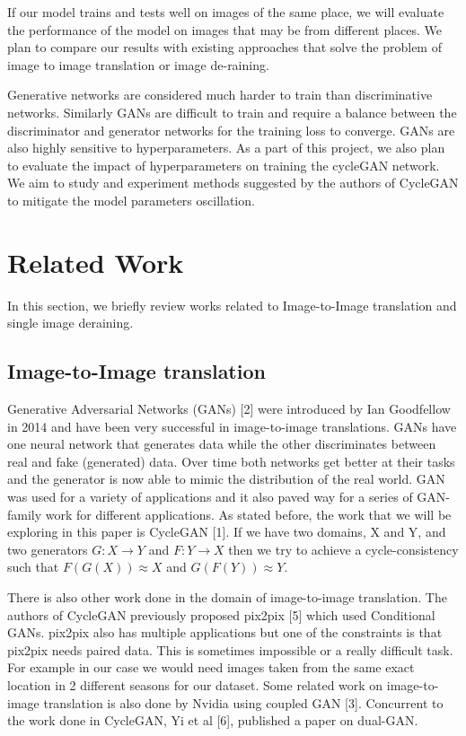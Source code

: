 \documentclass{article}
\begin{document}
If our model trains and tests well on images of the same place, we will 
evaluate the performance of the model on images that may be from different 
places. We plan to compare our results with existing approaches that solve 
the problem of image to image translation or image de-raining.

Generative networks are considered much harder to train than discriminative 
networks. Similarly GANs are difficult to train and require a balance 
between the discriminator and generator networks for the training loss 
to converge. GANs are also highly sensitive to hyperparameters. 
As a part of this project, we also plan to evaluate the impact of 
hyperparameters on training the cycleGAN network. We aim to study and 
experiment methods suggested by the authors of CycleGAN to mitigate the 
model parameters oscillation.

\section{Related Work}
\label{gen_inst}

In this section, we briefly review works related to Image-to-Image translation and single image deraining.

\subsection{Image-to-Image translation}

Generative Adversarial Networks (GANs) [2] were introduced by  Ian Goodfellow in 2014 and have been very successful in image-to-image translations. GANs have one neural network that generates data while the other discriminates between real and fake (generated) data. Over time both networks get better at their tasks and the generator is now able to mimic the distribution of the real world. GAN was used for a variety of applications and it also paved way for a series of GAN-family work for different applications. As stated before, the work that we will be exploring in this paper is CycleGAN [1]. If we have two domains, X and Y, and two generators $G: X \rightarrow Y$ and $F: Y \rightarrow  X$ then we try to achieve a cycle-consistency such that $F(G(X)) \approx X$ and $G(F(Y)) \approx Y$.

There is also other work done in the domain of image-to-image translation. The authors of CycleGAN previously proposed pix2pix [5] which used Conditional GANs. pix2pix also has multiple applications but one of the constraints is that pix2pix needs paired data. This is sometimes impossible or a really difficult task. For example in our case we would need images taken from the same exact location in 2 different seasons for our dataset. Some related work on image-to-image translation is also done by Nvidia using coupled GAN [3]. Concurrent to the work done in CycleGAN, Yi et al [6], published a paper on dual-GAN.
\end{document}
